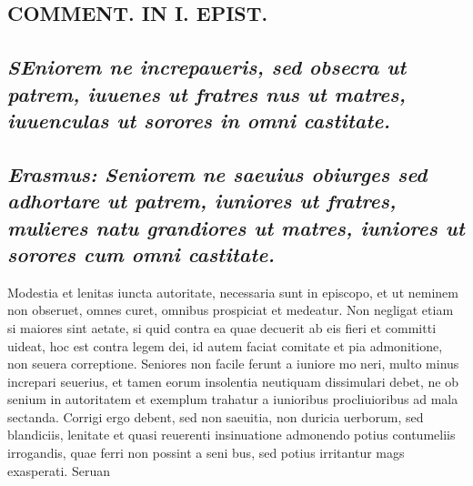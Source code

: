 \documentclass{article}
\begin{document}
\begin{pages}
\section*{COMMENT. IN I. EPIST. }
\marginpar{[ p.114 ]}
{}
\subsection*{\textit{\huge\textbf{S}\normalsize Eniorem ne increpaueris, sed obsecra ut patrem, iuuenes ut fratres nus ut matres, iuuenculas ut sorores in omni castitate. }}
{}
\subsection*{\textit{Erasmus: Seniorem ne saeuius obiurges sed adhortare ut patrem, iuniores ut fratres, mulieres natu grandiores ut matres, iuniores ut sorores cum omni castitate. }}\pstart Modestia et lenitas iuncta autoritate, necessaria sunt in episcopo, et ut neminem non obseruet, omnes curet, omnibus prospiciat et medeatur. Non negligat etiam si maiores sint aetate, si quid contra ea quae decuerit ab eis fieri et committi uideat, hoc est contra legem dei, id autem faciat comitate et pia admonitione, non seuera correptione.  \pend\pstart Seniores non facile ferunt a iuniore mo neri, multo minus increpari seuerius, et tamen eorum insolentia neutiquam dissimulari debet, ne ob senium in autoritatem et exemplum trahatur a iunioribus procliuioribus ad mala sectanda. Corrigi ergo debent, sed non saeuitia, non duricia uerborum, sed blandiciis, lenitate et quasi reuerenti insinuatione admonendo potius contumeliis irrogandis, quae ferri non possint a seni bus, sed potius irritantur mags exasperati. Seruan  \pend

\end{pages}
\end{document}
